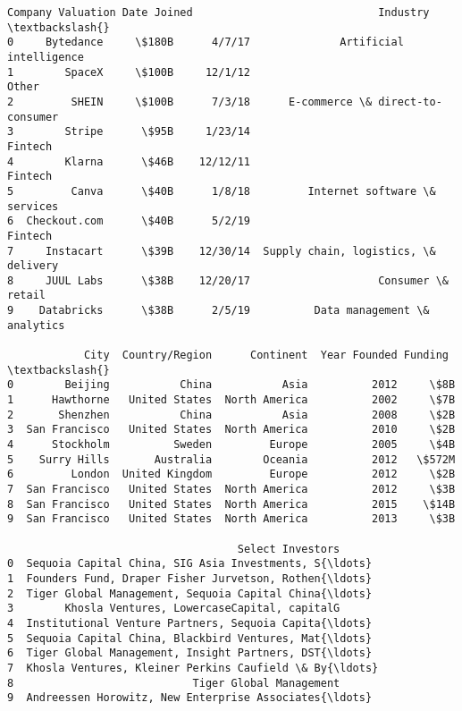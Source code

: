 \documentclass[11pt]{article}
\makeatletter
\newcommand{\boxspacing}{\kern\kvtcb@left@rule\kern\kvtcb@boxsep}
\newcommand{\prompt}[4]{
        \ttfamily\llap{{\color{#2}[#3]:\hspace{3pt}#4}}\vspace{-\baselineskip}
    }
\makeatother
\begin{document}
            \begin{tcolorbox}[breakable, size=fbox, boxrule=.5pt, pad at break*=1mm, opacityfill=0]
\prompt{Out}{outcolor}{3}{\boxspacing}
\begin{Verbatim}[commandchars=\\\{\}]
        Company Valuation Date Joined                             Industry  \textbackslash{}
0     Bytedance     \$180B      4/7/17              Artificial intelligence
1        SpaceX     \$100B     12/1/12                                Other
2         SHEIN     \$100B      7/3/18      E-commerce \& direct-to-consumer
3        Stripe      \$95B     1/23/14                              Fintech
4        Klarna      \$46B    12/12/11                              Fintech
5         Canva      \$40B      1/8/18         Internet software \& services
6  Checkout.com      \$40B      5/2/19                              Fintech
7     Instacart      \$39B    12/30/14  Supply chain, logistics, \& delivery
8     JUUL Labs      \$38B    12/20/17                    Consumer \& retail
9    Databricks      \$38B      2/5/19          Data management \& analytics

            City  Country/Region      Continent  Year Founded Funding  \textbackslash{}
0        Beijing           China           Asia          2012     \$8B
1      Hawthorne   United States  North America          2002     \$7B
2       Shenzhen           China           Asia          2008     \$2B
3  San Francisco   United States  North America          2010     \$2B
4      Stockholm          Sweden         Europe          2005     \$4B
5    Surry Hills       Australia        Oceania          2012   \$572M
6         London  United Kingdom         Europe          2012     \$2B
7  San Francisco   United States  North America          2012     \$3B
8  San Francisco   United States  North America          2015    \$14B
9  San Francisco   United States  North America          2013     \$3B

                                    Select Investors
0  Sequoia Capital China, SIG Asia Investments, S{\ldots}
1  Founders Fund, Draper Fisher Jurvetson, Rothen{\ldots}
2  Tiger Global Management, Sequoia Capital China{\ldots}
3        Khosla Ventures, LowercaseCapital, capitalG
4  Institutional Venture Partners, Sequoia Capita{\ldots}
5  Sequoia Capital China, Blackbird Ventures, Mat{\ldots}
6  Tiger Global Management, Insight Partners, DST{\ldots}
7  Khosla Ventures, Kleiner Perkins Caufield \& By{\ldots}
8                            Tiger Global Management
9  Andreessen Horowitz, New Enterprise Associates{\ldots}
\end{Verbatim}
\end{tcolorbox}
        
\end{document}
